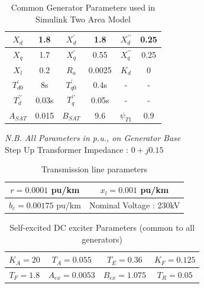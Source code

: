 \documentclass[journal]{IEEEtran}
\begin{document}
\begin{table}[!ht]
\caption{Common Generator Parameters used in Simulink Two Area Model}
\begin{center}
\begin{tabular}{|c|c|c|c|c|c|}

\hline $ X_{d} $ & 1.8  &$ {X}_{d}^{\prime } $  & 1.8  & $ {X}_{d}^{\prime \prime } $ & 0.25  \\ 
\hline $ X_{q} $ & 1.7  &$ {X}_{q}^{\prime } $  & 0.55 & $ {X}_{q}^{\prime \prime } $ & 0.25 \\ 
\hline $ X_{l} $ & 0.2  & $ R_{a} $ & 0.0025  & $ K_{d} $  & 0 \\ 
\hline $ {T}_{d0}^{\prime } $ &8s  & $ {T}_{q0}^{\prime } $ & 0.4s & - & - \\ 
\hline $ {T}_{d}^{\prime \prime } $ & 0.03s & $ {T}_{q}^{\prime \prime } $ & 0.05s  &- &-  \\ 
\hline $ A_{SAT} $& 0.015 & $ B_{SAT} $ & 9.6 & $ \psi_{T1} $  & 0.9 \\ 
\hline 
\end{tabular}
\end{center}
\end{table}
\emph{N.B. All Parameters in p.u., on Generator Base}\\

Step Up Transformer Impedance : $0+j0.15$\\

\begin{table}[!ht]
\caption{Transmission line parameters}
\begin{center}
\begin{tabular}{|c|c|}
\hline $r=0.0001$ pu/km & $x_{l}=0.001$ pu/km \\
\hline $b_{c}=0.00175$ pu/km &  Nominal Voltage : 230kV\\ 
\hline 
\end{tabular}
\end{center}
\end{table}

\begin{table}[!ht]
\caption{Self-excited DC exciter Parameters (common to all generators)}
\begin{center}
\begin{tabular}{|c|c|c|c|}
\hline  $ K_{A} = 20 $& $ T_{A} = 0.055 $ & $ T_{E} = 0.36 $ & $ K_{F} = 0.125 $ \\ 
\hline $ T_{F} = 1.8 $ & $ A_{ex} = 0.0053 $ & $ B_{ex} = 1.075 $ & $ T_{R} = 0.05 $ \\ 
\hline 
\end{tabular} 
\end{center}
\end{table}
\end{document}
